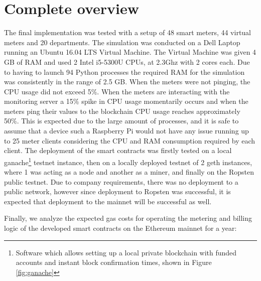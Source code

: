 \section{Complete overview}
The final implementation was tested with a setup of 48 smart meters, 44 virtual meters and 20 departments. The simulation was conducted on a Dell Laptop running an Ubuntu 16.04 LTS Virtual Machine. The Virtual Machine was given 4 GB of RAM and used 2 Intel i5-5300U CPUs, at 2.3Ghz with 2 cores each. Due to having to launch 94 Python processes the required RAM for the simulation was consistently in the range of 2.5 GB. When the meters were not pinging, the CPU usage did not exceed 5\%. When the meters are interacting with the monitoring server a 15\% spike in CPU usage momentarily occurs and when the meters ping their values to the blockchain CPU usage reaches approximately 50\%. This is expected due to the large amount of processes, and it is safe to assume that a device such a Raspberry Pi would not have any issue running up to 25 meter clients considering the CPU and RAM consumption required by each client. The deployment of the smart contracts was firstly tested on a local ganache\footnote{Software which allows setting up a local private blockchain with funded accounts and instant block confirmation times, shown in Figure \ref{fig:ganache}} testnet instance, then on a locally deployed testnet of 2 geth instances, where 1 was acting as a node and another as a miner, and finally on the Ropsten public testnet. Due to company requirements, there was no deployment to a public network, however since deployment to Ropsten was successful, it is expected that deployment to the mainnet will be successful as well.

Finally, we analyze the expected gas costs for operating the metering and billing logic of the developed smart contracts on the Ethereum mainnet for a year:

